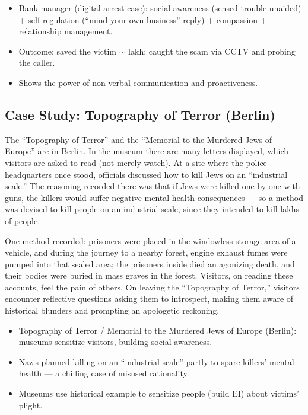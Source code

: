 \begin{ExampleBox}
\begin{itemize}
\item Bank manager (digital-arrest case): social awareness (sensed trouble unaided) + self-regulation (``mind your own business'' reply) + compassion + relationship management.
\item Outcome: saved the victim $\sim$ lakh; caught the scam via CCTV and probing the caller.
\item Shows the power of non-verbal communication and proactiveness.
\end{itemize}
\end{ExampleBox}

\subsection{Case Study: Topography of Terror (Berlin)}

The ``Topography of Terror'' and the ``Memorial to the Murdered Jews of Europe'' are in Berlin. In the museum there are many letters displayed, which visitors are asked to read (not merely watch). At a site where the police headquarters once stood, officials discussed how to kill Jews on an ``industrial scale.'' The reasoning recorded there was that if Jews were killed one by one with guns, the killers would suffer negative mental-health consequences --- so a method was devised to kill people on an industrial scale, since they intended to kill lakhs of people.

One method recorded: prisoners were placed in the windowless storage area of a vehicle, and during the journey to a nearby forest, engine exhaust fumes were pumped into that sealed area; the prisoners inside died an agonizing death, and their bodies were buried in mass graves in the forest. Visitors, on reading these accounts, feel the pain of others. On leaving the ``Topography of Terror,'' visitors encounter reflective questions asking them to introspect, making them aware of historical blunders and prompting an apologetic reckoning.

\begin{ExampleBox}
\begin{itemize}
\item Topography of Terror / Memorial to the Murdered Jews of Europe (Berlin): museums sensitize visitors, building social awareness.
\item Nazis planned killing on an ``industrial scale'' partly to spare killers' mental health --- a chilling case of misused rationality.
\item Museums use historical example to sensitize people (build EI) about victims' plight.
\end{itemize}
\end{ExampleBox}

